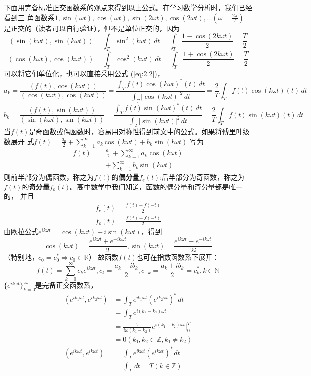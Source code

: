 \documentclass{ctexbook}
\begin{document}
下面用完备标准正交函数系的观点来得到以上公式。在学习数学分析时，我们已经看到三
角函数系$1,\sin(\omega t),\cos(\omega t),\sin(2\omega t),\cos(2\omega t),\dots(\omega =\frac{2\pi}{T})$
是正交的（读者可以自行验证），但不是单位正交的，因为
\[(\sin(k\omega t),\sin(k\omega t))=\int_{T}\sin^2(k\omega t)\,dt=\int_{T}\frac{1-\cos(2k\omega t)}{2}=\frac{T}{2}\]
\[(\cos(k\omega t),\cos(k\omega t))=\int_{T}\cos^2(k\omega t)\,dt=\int_{T}\frac{1+\cos(2k\omega t)}{2}=\frac{T}{2}\]
可以将它们单位化，也可以直接采用公式 (\ref{eq:2.2})，
\[a_k=\frac{(f(t),\cos(k\omega t))}{(\cos(k\omega t),\cos(k\omega t))}=\frac{\int_{T}f(t)\cos(k\omega t)^*(t)\,dt}{\int_{T}|\cos(k\omega t)|^2\,dt}
    =\frac{2}{T}\int_{T}f(t)\cos(k\omega t)(t)\,dt\]
\[b_k=\frac{(f(t),\sin(k\omega t))}{(\sin(k\omega t),\sin(k\omega t))}=\frac{\int_{T}f(t)\sin(k\omega t)^*(t)\,dt}{\int_{T}|\sin(k\omega t)|^2\,dt}
    =\frac{2}{T}\int_{T}f(t)\sin(k\omega t)(t)\,dt\]
当$f(t)$是奇函数或偶函数时，容易用对称性得到前文中的公式。如果将傅里叶级数展开
式$f(t) =\frac{a_0}{2}+\sum_{k = 1}^{\infty} a_k \cos(k\omega t)+b_k\sin(k\omega t)$
写为
\begin{align*}
    f(t) = & \frac{a_0}{2}+\sum_{k = 1}^{\infty} a_k \cos(k\omega t) \\
           & +\sum_{k = 1}^{\infty} b_k \sin(k\omega t)
\end{align*}
则前半部分为偶函数，称之为$f(t)$的\textbf{偶分量}$f_e(t)$;后半部分为奇函数，称之为
$f(t)$的\textbf{奇分量}$f_o(t)$。高中数学中我们知道，函数的偶分量和奇分量都是唯一的，
并且\begin{align*}
    f_e(t)=\frac{f(t)+f(-t)}{2} \\
    f_o(t)=\frac{f(t)-f(-t)}{2}
\end{align*}
由欧拉公式$e^{ik\omega t}=\cos(k\omega t)+i\sin(k\omega t)$，得到
\[\cos(k\omega t)=\frac{e^{ik\omega t}+e^{-ik\omega t}}{2},\sin(k\omega t)=\frac{e^{ik\omega t}-e^{-ik\omega t}}{2i}\]
（特别地，$c_0=c_0^*\Rightarrow c_0\in\mathbb{R} $）
故函数$f(t)$也可在指数函数系下展开：
\[f(t)=\sum_{k = 0}^{\infty}  c_k e^{ik\omega t} ,c_k=\frac{a_k-ib_k}{2},c_{-k}=\frac{a_k+ib_k}{2}=c_k^*,k\in \mathbb{N}\]
$\{e^{ik\omega t}\}_{k=0}^{\infty}$是完备正交函数系，
\begin{align*}
    (e^{ik_1\omega t},e^{ik_2\omega t}) & =\int_{T}e^{ik_1\omega t}(e^{ik_2\omega t})^*\,dt       \\
                                        & =\int_{T}e^{i(k_1-k_2)\omega t}                         \\
                                        & =\frac{2}{i\omega (k_1-k_2)}e^{i(k_1-k_2)\omega t}|_0^T \\
                                        & =0(k_1,k_2\in \mathbb{Z},k_1\neq k_2)                   \\
    (e^{ik\omega t},e^{ik\omega t})     & =\int_{T}e^{ik\omega t}(e^{ik\omega t})^*\,dt           \\
                                        & =\int_{T}\,dt=T(k\in \mathbb{Z} )
\end{align*}
\end{document}
